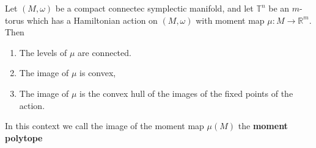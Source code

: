 \documentclass[11pt, final]{article}
\begin{document}
\begin{theorem}
	Let $(M,\omega)$ be a compact connectec symplectic manifold, and let $\mathbb{T}^n$ be an $m$-torus which has a Hamiltonian action on $(M,\omega)$ with moment map $\mu: M \to \mathbb{R}^m$. Then
		\begin{enumerate}[label = (\alph*)]
			\item	The levels of $\mu$ are connected.
			\item 	The image of $\mu$ is convex,
			\item	The image of $\mu$ is the convex hull of the images of the fixed points of the action.
		\end{enumerate}
\end{theorem}
\begin{remark}
	In this context we call the image of the moment map $ \mu(M) $ the \textbf{moment polytope}
\end{remark}
\end{document}
